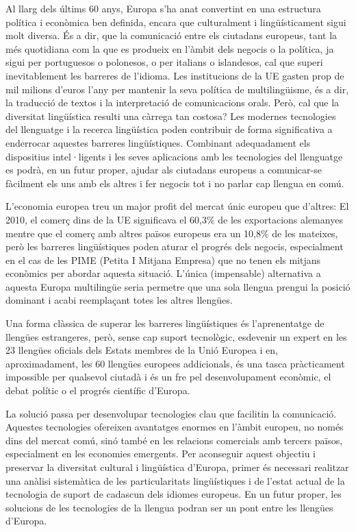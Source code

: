 \begin{multicols}{2}

Al llarg dels últims 60 anys, Europa s'ha anat convertint en una estructura política i econòmica ben definida, encara que culturalment i lingüísticament sigui molt diversa. És a dir, que la comunicació entre els ciutadans europeus,
tant la més quotidiana com la que es produeix en l'àmbit dels negocis o la política, ja sigui per portuguesos o polonesos, o per italians o islandesos, cal que superi inevitablement les barreres de l'idioma. Les institucions de la UE gasten prop de mil milions d'euros l'any per mantenir la seva política de multilingüisme, és a dir, la traducció de textos i la interpretació de comunicacions orals. Però, cal que la diversitat lingüística resulti una càrrega tan costosa? Les modernes tecnologies del llenguatge i la recerca lingüística poden contribuir de forma significativa a enderrocar aquestes barreres lingüístiques. Combinant adequadament els dispositius intel·ligents i les seves aplicacions amb les tecnologies del llenguatge es podrà, en un futur proper, ajudar als ciutadans europeus a comunicar-se fàcilment els uns amb els altres i fer negocis tot i no parlar cap llengua en comú.


L'economia europea treu un major profit del mercat únic europeu que d'altres: El 2010, el comerç dins de la UE significava el 60,3\% de les exportacions alemanyes mentre que el comerç amb altres països europeus era un 10,8\% de les mateixes, però les barreres lingüístiques poden aturar el progrés dels negocis, especialment en el cas de les PIME (Petita I Mitjana Empresa) que no tenen els mitjans econòmics per abordar aquesta situació. L'única (impensable) alternativa a aquesta Europa multilingüe seria permetre que una sola llengua prengui la posició dominant i acabi reemplaçant totes les altres llengües.

Una forma clàssica de superar les barreres lingüístiques és l'aprenentatge de llengües estrangeres, però, sense cap suport tecnològic, esdevenir un expert en les 23 llengües oficials dels Estats membres de la Unió Europea i en, aproximadament, les 60 llengües europees addicionals, és una tasca pràcticament impossible per qualsevol ciutadà i és un fre pel desenvolupament econòmic, el debat polític o el progrés científic d’Europa.

La solució passa per desenvolupar tecnologies clau que facilitin la comunicació. Aquestes tecnologies ofereixen avantatges enormes  en l'àmbit europeu, no només dins del mercat comú, sinó també en les relacions comercials amb tercers països, especialment en les economies emergents. Per aconseguir aquest objectiu i preservar la diversitat cultural i lingüística d'Europa, primer és necessari realitzar una anàlisi sistemàtica de les particularitats lingüístiques i de l'estat actual de la tecnologia de suport de cadascun dels idiomes europeus. En un futur proper, les solucions de les tecnologies de la llengua podran ser un pont entre les llengües d'Europa.


\end{multicols}
